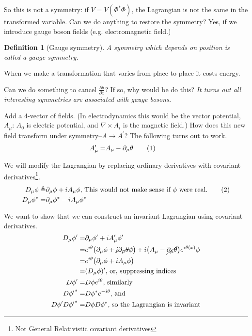 \documentclass[]{article}
\newcommand\numberthis{\addtocounter{equation}{1}\tag{\theequation}}
\newtheorem{defn}[thm]{Definition}
\begin{document}
So this is not a symmetry: if $V=V(\Phi^*\Phi)$, the Lagrangian is not the same in the transformed variable.  Can we do anything to restore the symmetry? Yes, if we introduce gauge boson fields (e.g. electromagnetic field.)

\begin{defn}[Gauge symmetry]
	A symmetry which depends on position is called a gauge symmetry.
\end{defn}

When we make a transformation that varies from place to place it costs energy.

Can we do something to cancel $\frac{\partial \theta}{\partial x}$? If so, why would be do this? \emph{It turns out all interesting symmetries are associated with gauge bosons.}

Add a 4-vector of fields. (In electrodynamics this would be the vector potential, $A_\mu$: $A_0$ is electric potential, and $\nabla \times A_i$ is the magnetic field.) How does this new field transform under symmetry--$A \rightarrow A^\prime$? The following turns out to work.
\begin{align*}
	A^\prime_\mu =& A_\mu - \partial_\mu \theta \numberthis \label{eq:gauge:field}
\end{align*}

We will modify the Lagrangian by replacing ordinary derivatives with covariant derivatives\footnote{Not General Relativistic covariant derivatives}.
\begin{align*}
	D_\mu \phi \triangleq& \partial_\mu \phi + i A_\mu \phi \text{, This would not make sense if $\phi$ were real.} \numberthis \label{eq:covariant:derivative}\\
	D_\mu \phi^* =& \partial_\mu \phi^* - i A_\mu \phi^*
\end{align*}

We want to show that we can construct an invariant Lagrangian using covariant derivatives.
\begin{align*}
	D_\mu \phi^\prime =& \partial_\mu \phi^\prime + i A_\mu^\prime \phi^\prime\\
	=& e^{i\theta}\big(\partial_\mu \phi +\cancel{i\partial_\mu \theta \phi} \big) + i \big(A_\mu -\cancel{ \partial_\mu \theta} \big) e^{i \theta(x)} \phi\\
	=& e^{i\theta} \big( \partial_\mu \phi +i A_\mu \phi \big)\\
	=& (D_\mu \phi)^\prime \text{, or, suppressing indices}\\
	D \phi^\prime =&  D \phi  e^{i \theta} \text{, similarly}\\
	D {\phi^\prime}^* =& D {\phi}^*  e^{-i \theta} \text{, and}\\
	D \phi^\prime D {\phi^\prime}^*=& D \phi D {\phi}^* \text{, so the Lagrangian is invariant}
\end{align*}
\end{document}
